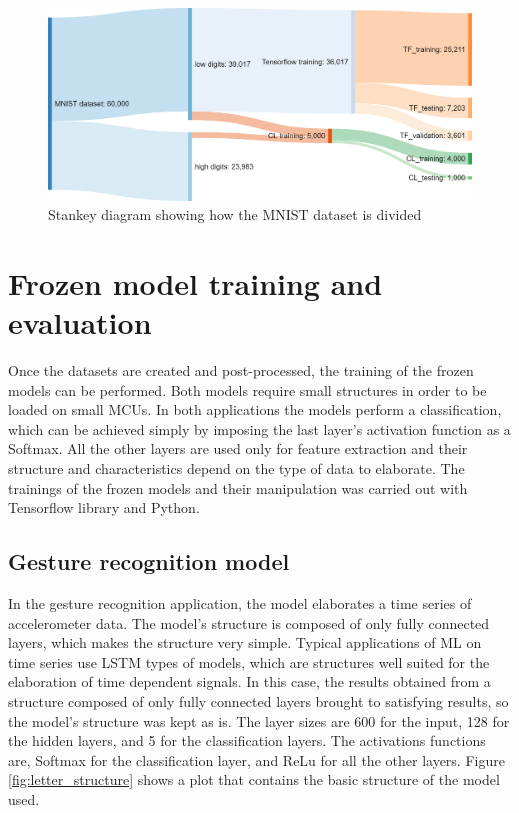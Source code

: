 \documentclass[12pt]{report}
\begin{document}
\begin{figure}[h!]
    \centering
    \includegraphics[width=120mm]{Figures/Chapter4/flow_dataset_openmv.png} 
    \caption{Stankey diagram showing how the MNIST dataset is divided}
    \label{fig:flow_dataset_openmv}    
\end{figure}

\section{Frozen model training and evaluation}
Once the datasets are created and post-processed, the training of the frozen models can be performed. Both models require small structures in order to be loaded on small MCUs. In both applications the models perform a classification, which can be achieved simply by imposing the last layer's activation function as a Softmax. All the other layers are used only for feature extraction and their structure and characteristics depend on the type of data to elaborate.
The trainings of the frozen models and their manipulation was carried out with Tensorflow library and Python.\\

\subsection{Gesture recognition model}
In the gesture recognition application, the model elaborates a time series of accelerometer data. The model's structure is composed of only fully connected layers, which makes the structure very simple. Typical applications of ML on time series use LSTM types of models, which are structures well suited for the elaboration of time dependent signals. In this case, the results obtained from a structure composed of only fully connected layers brought to satisfying results, so the model's structure was kept as is. The layer sizes are 600 for the input, 128 for the hidden layers, and 5 for the classification layers. The activations functions are, Softmax for the classification layer, and ReLu for all the other layers. Figure \ref{fig:letter_structure} shows a plot that contains the basic structure of the model used.\\
\end{document}
